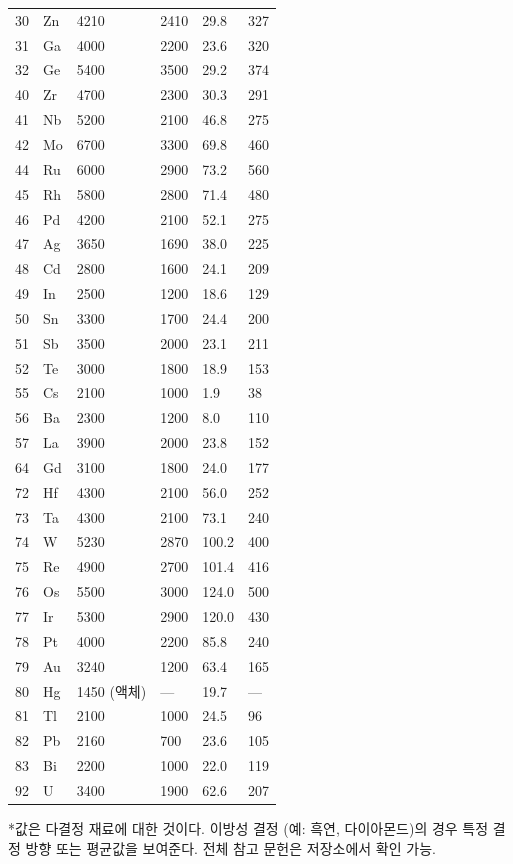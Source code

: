 \documentclass[12pt,a4paper]{article}
\begin{document}
\begin{longtable}{p{0.8cm}p{1.2cm}p{2.2cm}p{2.2cm}p{2.2cm}p{2.2cm}}
		30 & Zn & 4210 & 2410 & 29.8 & 327 \\
		31 & Ga & 4000 & 2200 & 23.6 & 320 \\
		32 & Ge & 5400 & 3500 & 29.2 & 374 \\
		40 & Zr & 4700 & 2300 & 30.3 & 291 \\
		41 & Nb & 5200 & 2100 & 46.8 & 275 \\
		42 & Mo & 6700 & 3300 & 69.8 & 460 \\
		44 & Ru & 6000 & 2900 & 73.2 & 560 \\
		45 & Rh & 5800 & 2800 & 71.4 & 480 \\
		46 & Pd & 4200 & 2100 & 52.1 & 275 \\
		47 & Ag & 3650 & 1690 & 38.0 & 225 \\
		48 & Cd & 2800 & 1600 & 24.1 & 209 \\
		49 & In & 2500 & 1200 & 18.6 & 129 \\
		50 & Sn & 3300 & 1700 & 24.4 & 200 \\
		51 & Sb & 3500 & 2000 & 23.1 & 211 \\
		52 & Te & 3000 & 1800 & 18.9 & 153 \\
		55 & Cs & 2100 & 1000 & 1.9 & 38 \\
		56 & Ba & 2300 & 1200 & 8.0 & 110 \\
		57 & La & 3900 & 2000 & 23.8 & 152 \\
		64 & Gd & 3100 & 1800 & 24.0 & 177 \\
		72 & Hf & 4300 & 2100 & 56.0 & 252 \\
		73 & Ta & 4300 & 2100 & 73.1 & 240 \\
		74 & W  & 5230 & 2870 & 100.2 & 400 \\
		75 & Re & 4900 & 2700 & 101.4 & 416 \\
		76 & Os & 5500 & 3000 & 124.0 & 500 \\
		77 & Ir & 5300 & 2900 & 120.0 & 430 \\
		78 & Pt & 4000 & 2200 & 85.8 & 240 \\
		79 & Au & 3240 & 1200 & 63.4 & 165 \\
		80 & Hg & 1450 (액체) & --- & 19.7 & --- \\
		81 & Tl & 2100 & 1000 & 24.5 & 96 \\
		82 & Pb & 2160 & 700 & 23.6 & 105 \\
		83 & Bi & 2200 & 1000 & 22.0 & 119 \\
		92 & U  & 3400 & 1900 & 62.6 & 207 \\
		\bottomrule
	\end{longtable}
	*값은 다결정 재료에 대한 것이다. 이방성 결정 (예: 흑연, 다이아몬드)의 경우 특정 결정 방향 또는 평균값을 보여준다. 전체 참고 문헌은 저장소에서 확인 가능.
	
\end{document}
